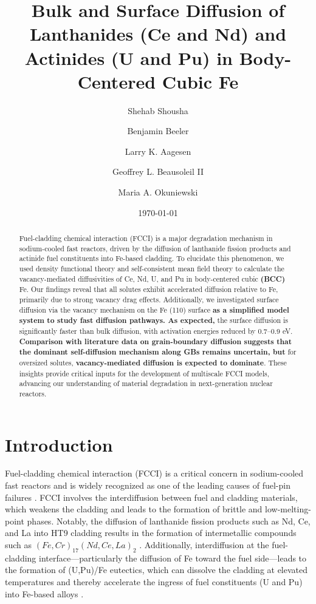\documentclass[preprint,12pt]{elsarticle}
\title{Bulk and Surface Diffusion of Lanthanides (Ce and  Nd) and Actinides (U and Pu) in Body-Centered Cubic Fe}
\author[inst1]{Shehab Shousha}
\affiliation[inst1]{organization={North Carolina State University},%
            city={Raleigh},
            state={NC},
            postcode={27695}, 
            country={United States}}
\author[inst1,inst2]{Benjamin Beeler}
\affiliation[inst2]{organization={Idaho National Laboratory},%
            city={Idaho Falls},
            state={ID},
            postcode={83415}, 
            country={United States}}
\author[inst2,inst3]{Larry K. Aagesen}
\affiliation[inst3]{organization={Department of Nuclear Engineering and Radiological Sciences, University of Michigan},%
            city={Ann Arbor},
            state={MI},
            postcode={48109}, 
            country={United States}}
\author[inst2]{Geoffrey L. Beausoleil II}
\author[inst4]{Maria A. Okuniewski}
\affiliation[inst4]{organization={Purdue University},%
            city={West Lafayette},
            state={IN},
            postcode={47907}, 
            country={United States}}
\date{\today}
\providecommand{\DIFaddtex}[1]{{\bf #1}} %
\providecommand{\DIFdeltex}[1]{} %
\providecommand{\DIFaddbegin}{\protect\color{blue}} %
\providecommand{\DIFaddend}{\protect\color{black}} %
\providecommand{\DIFdelbegin}{\protect\color{red}} %
\providecommand{\DIFdelend}{\protect\color{black}} %
\providecommand{\DIFadd}[1]{\texorpdfstring{\DIFaddtex{#1}}{#1}} %
\providecommand{\DIFdel}[1]{\texorpdfstring{\DIFdeltex{#1}}{}} %
\newcommand{\DIFscaledelfig}{0.5}
\newlength{\DIFdelgraphicswidth} %
\newlength{\DIFdelgraphicsheight} %
\newcommand{\DIFaddincludegraphics}[2][]{{\color{blue}\fbox{\DIFOincludegraphics[#1]{#2}}}} %
\newcommand{\DIFdelincludegraphics}[2][]{%
\sbox{\DIFdelgraphicsbox}{\DIFOincludegraphics[#1]{#2}}%
\settoboxwidth{\DIFdelgraphicswidth}{\DIFdelgraphicsbox} %
\settoboxtotalheight{\DIFdelgraphicsheight}{\DIFdelgraphicsbox} %
\scalebox{\DIFscaledelfig}{%
\parbox[b]{\DIFdelgraphicswidth}{\usebox{\DIFdelgraphicsbox}\\[-\baselineskip] \rule{\DIFdelgraphicswidth}{0em}}\llap{\resizebox{\DIFdelgraphicswidth}{\DIFdelgraphicsheight}{%
\setlength{\unitlength}{\DIFdelgraphicswidth}%
\begin{picture}(1,1)%
\thicklines\linethickness{2pt} %
{\color[rgb]{1,0,0}\put(0,0){\framebox(1,1){}}}%
{\color[rgb]{1,0,0}\put(0,0){\line( 1,1){1}}}%
{\color[rgb]{1,0,0}\put(0,1){\line(1,-1){1}}}%
\end{picture}%
}\hspace*{3pt}}} %
} %
\DeclareRobustCommand{\DIFaddbegin}{\DIFOaddbegin \let\includegraphics\DIFaddincludegraphics} %
\DeclareRobustCommand{\DIFaddend}{\DIFOaddend \let\includegraphics\DIFOincludegraphics} %
\DeclareRobustCommand{\DIFdelbegin}{\DIFOdelbegin \let\includegraphics\DIFdelincludegraphics} %
\DeclareRobustCommand{\DIFdelend}{\DIFOaddend \let\includegraphics\DIFOincludegraphics} %
\begin{document}
\begin{abstract}
Fuel-cladding chemical interaction (FCCI) is a major degradation mechanism in sodium-cooled fast reactors, driven by the diffusion of lanthanide fission products and actinide fuel constituents into Fe-based cladding.  To elucidate this phenomenon, we used density functional theory and self-consistent mean field theory to calculate the vacancy-mediated diffusivities of Ce, Nd, U, and Pu in body-centered cubic \DIFaddbegin \DIFadd{(BCC) }\DIFaddend Fe. Our findings reveal that all solutes exhibit accelerated diffusion relative to Fe, primarily due to strong vacancy drag effects. Additionally, we investigated surface diffusion via the vacancy mechanism on the Fe (110) surface \DIFdelbegin \DIFdel{, which serves as a proxy for grain boundary (GB) diffusion . The results indicate that }\DIFdelend \DIFaddbegin \DIFadd{as a simplified model system to study fast diffusion pathways. As expected, }\DIFaddend the surface diffusion is significantly faster than bulk diffusion, with activation energies reduced by 0.7–0.9 eV. \DIFdelbegin \DIFdel{While vacancy-mediated transport is likely }\DIFdelend \DIFaddbegin \DIFadd{Comparison with literature data on grain-boundary diffusion suggests that the dominant self-diffusion mechanism along GBs remains uncertain, but }\DIFaddend for oversized solutes, \DIFdelbegin \DIFdel{GB self-diffusion mechanisms remain uncertain}\DIFdelend \DIFaddbegin \DIFadd{vacancy-mediated diffusion is expected to dominate}\DIFaddend . These insights provide critical inputs for the development of multiscale FCCI models, advancing our understanding of material degradation in next-generation nuclear reactors. 
\end{abstract}

\maketitle

\section{Introduction}

\noindent Fuel-cladding chemical interaction (FCCI) is a critical concern in sodium-cooled fast reactors \cite{hofman_metallic_1997, pahl_experimental_1990, thomas_nano-mechanical_2021} and is widely recognized as one of the leading causes of fuel-pin failures \cite{matthews_fuel-cladding_2017}. FCCI involves the interdiffusion between fuel and cladding materials, which weakens the cladding and leads to the formation of brittle and low-melting-point phases. Notably, the diffusion of lanthanide fission products such as Nd, Ce, and La into HT9 cladding results in the formation of intermetallic compounds such as $(Fe, Cr)_{17}(Nd, Ce, La)_{2}$ \cite{keiser_fuel-cladding_2006, harp_scanning_2017}. Additionally, interdiffusion at the fuel-cladding interface—particularly the diffusion of Fe toward the fuel side—leads to the formation of (U,Pu)/Fe eutectics, which can dissolve the cladding at elevated temperatures and thereby accelerate the ingress of fuel constituents (U and Pu) into Fe-based alloys \cite{matthews_fuel-cladding_2017, keiser2009development, cohen1993fuel}.
\end{document}

